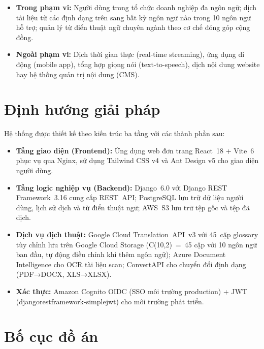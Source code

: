 \begin{itemize}
  \item \textbf{Trong phạm vi:} Người dùng trong tổ chức doanh nghiệp đa ngôn ngữ; dịch tài
    liệu từ các định dạng trên sang bất kỳ ngôn ngữ nào trong 10 ngôn ngữ hỗ trợ; quản lý
    từ điển thuật ngữ chuyên ngành theo cơ chế đóng góp cộng đồng.

  \item \textbf{Ngoài phạm vi:} Dịch thời gian thực (real-time streaming), ứng dụng di động
    (mobile app), tổng hợp giọng nói (text-to-speech), dịch nội dung website hay hệ thống
    quản trị nội dung (CMS).
\end{itemize}

\section{Định hướng giải pháp}

Hệ thống được thiết kế theo kiến trúc ba tầng với các thành phần sau:

\begin{itemize}
  \item \textbf{Tầng giao diện (Frontend):} Ứng dụng web đơn trang React~18 + Vite~6 phục vụ
    qua Nginx, sử dụng Tailwind CSS v4 và Ant Design v5 cho giao diện người dùng.

  \item \textbf{Tầng logic nghiệp vụ (Backend):} Django~6.0 với Django REST Framework~3.16
    cung cấp REST~API; PostgreSQL lưu trữ dữ liệu người dùng, lịch sử dịch và từ điển thuật
    ngữ; AWS~S3 lưu trữ tệp gốc và tệp đã dịch.

  \item \textbf{Dịch vụ dịch thuật:} Google Cloud Translation~API~v3 với 45~cặp glossary tùy
    chỉnh lưu trên Google Cloud Storage (C(10,2)~=~45 cặp với 10 ngôn ngữ ban đầu, tự động
    điều chỉnh khi thêm ngôn ngữ); Azure Document Intelligence cho OCR tài liệu scan;
    ConvertAPI cho chuyển đổi định dạng (PDF→DOCX, XLS→XLSX).

  \item \textbf{Xác thực:} Amazon Cognito OIDC (SSO môi trường production) + JWT
    (djangorestframework-simplejwt) cho môi trường phát triển.
\end{itemize}

\section{Bố cục đồ án}


